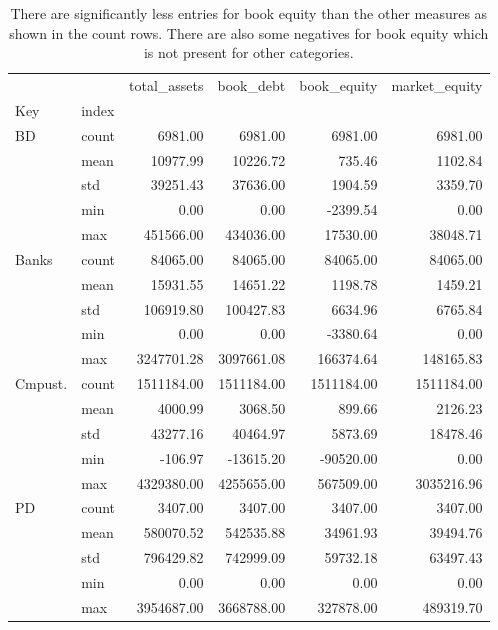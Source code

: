 \begin{table}
\caption{There are significantly less entries for book equity than the other measures as shown in the count rows. There are also some negatives for book equity which is not present for other categories. }
\label{tab:Table 2.1}
\begin{tabular}{llrrrr}
\toprule
 &  & total_assets & book_debt & book_equity & market_equity \\
Key & index &  &  &  &  \\
\midrule
{BD} & count & 6981.00 & 6981.00 & 6981.00 & 6981.00 \\
 & mean & 10977.99 & 10226.72 & 735.46 & 1102.84 \\
 & std & 39251.43 & 37636.00 & 1904.59 & 3359.70 \\
 & min & 0.00 & 0.00 & -2399.54 & 0.00 \\
 & max & 451566.00 & 434036.00 & 17530.00 & 38048.71 \\
\cline{1-6}
{Banks} & count & 84065.00 & 84065.00 & 84065.00 & 84065.00 \\
 & mean & 15931.55 & 14651.22 & 1198.78 & 1459.21 \\
 & std & 106919.80 & 100427.83 & 6634.96 & 6765.84 \\
 & min & 0.00 & 0.00 & -3380.64 & 0.00 \\
 & max & 3247701.28 & 3097661.08 & 166374.64 & 148165.83 \\
\cline{1-6}
{Cmpust.} & count & 1511184.00 & 1511184.00 & 1511184.00 & 1511184.00 \\
 & mean & 4000.99 & 3068.50 & 899.66 & 2126.23 \\
 & std & 43277.16 & 40464.97 & 5873.69 & 18478.46 \\
 & min & -106.97 & -13615.20 & -90520.00 & 0.00 \\
 & max & 4329380.00 & 4255655.00 & 567509.00 & 3035216.96 \\
\cline{1-6}
{PD} & count & 3407.00 & 3407.00 & 3407.00 & 3407.00 \\
 & mean & 580070.52 & 542535.88 & 34961.93 & 39494.76 \\
 & std & 796429.82 & 742999.09 & 59732.18 & 63497.43 \\
 & min & 0.00 & 0.00 & 0.00 & 0.00 \\
 & max & 3954687.00 & 3668788.00 & 327878.00 & 489319.70 \\
\cline{1-6}
\bottomrule
\end{tabular}
\end{table}
